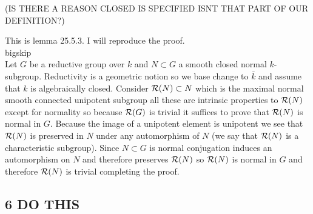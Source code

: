 \documentclass[12pt]{article}
\begin{document}
(IS THERE A REASON CLOSED IS SPECIFIED ISNT THAT PART OF OUR DEFINITION?)


This is lemma 25.5.3. I will reproduce the proof.
\\bigskip\\
Let $G$ be a reductive group over $k$ and $N \subset G$ a smooth closed normal $k$-subgroup.  Reductivity is a geometric notion so we base change to $\bar{k}$ and assume that $k$ is algebraically closed. Consider $\mathcal{R}(N) \subset N$ which is the maximal normal smooth connected unipotent subgroup all these are intrinsic properties to $\mathcal{R}(N)$ except for normality so because $\mathcal{R}(G)$ is trivial it suffices to prove that $\mathcal{R}(N)$ is normal in $G$. Because the image of a unipotent element is unipotent we see that $\mathcal{R}(N)$ is preserved in $N$ under any automorphism of $N$ (we say that $\mathcal{R}(N)$ is a characteristic subgroup). Since $N \subset G$ is normal conjugation induces an automorphism on $N$ and therefore preserves $\mathcal{R}(N)$ so $\mathcal{R}(N)$ is normal in $G$ and therefore $\mathcal{R}(N)$ is trivial completing the proof.

\subsection{6 DO THIS}
\end{document}
